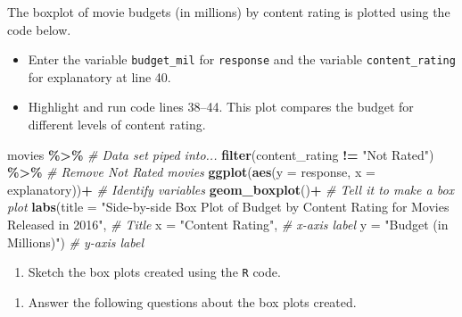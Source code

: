 \documentclass[
]{report}
\newenvironment{Shaded}{\begin{snugshade}}{\end{snugshade}}
\newcommand{\AttributeTok}[1]{\textcolor[rgb]{0.13,0.29,0.53}{#1}}
\newcommand{\CommentTok}[1]{\textcolor[rgb]{0.56,0.35,0.01}{\textit{#1}}}
\newcommand{\FunctionTok}[1]{\textcolor[rgb]{0.13,0.29,0.53}{\textbf{#1}}}
\newcommand{\NormalTok}[1]{#1}
\newcommand{\SpecialCharTok}[1]{\textcolor[rgb]{0.81,0.36,0.00}{\textbf{#1}}}
\newcommand{\StringTok}[1]{\textcolor[rgb]{0.31,0.60,0.02}{#1}}
\providecommand{\tightlist}{%
  \setlength{\itemsep}{0pt}\setlength{\parskip}{0pt}}
\begin{document}
The boxplot of movie budgets (in millions) by content rating is plotted using the code below.

\begin{itemize}
\item
  Enter the variable \texttt{budget\_mil} for \texttt{response} and the variable \texttt{content\_rating} for explanatory at line 40.
\item
  Highlight and run code lines 38--44. This plot compares the budget for different levels of content rating.
\end{itemize}

\begin{Shaded}
\begin{Highlighting}[]
\NormalTok{movies }\SpecialCharTok{\%\textgreater{}\%}  \CommentTok{\# Data set piped into...}
  \FunctionTok{filter}\NormalTok{(content\_rating }\SpecialCharTok{!=} \StringTok{"Not Rated"}\NormalTok{) }\SpecialCharTok{\%\textgreater{}\%} \CommentTok{\# Remove Not Rated movies}
  \FunctionTok{ggplot}\NormalTok{(}\FunctionTok{aes}\NormalTok{(}\AttributeTok{y =}\NormalTok{ response, }\AttributeTok{x =}\NormalTok{ explanatory))}\SpecialCharTok{+}  \CommentTok{\# Identify variables}
  \FunctionTok{geom\_boxplot}\NormalTok{()}\SpecialCharTok{+}  \CommentTok{\# Tell it to make a box plot}
  \FunctionTok{labs}\NormalTok{(}\AttributeTok{title =} \StringTok{"Side{-}by{-}side Box Plot of Budget by Content Rating for Movies Released in 2016"}\NormalTok{,  }
       \CommentTok{\# Title}
       \AttributeTok{x =} \StringTok{"Content Rating"}\NormalTok{,    }\CommentTok{\# x{-}axis label}
       \AttributeTok{y =} \StringTok{"Budget (in Millions)"}\NormalTok{)  }\CommentTok{\# y{-}axis label}
\end{Highlighting}
\end{Shaded}

\begin{enumerate}
\def\labelenumi{\arabic{enumi}.}
\setcounter{enumi}{11}
\tightlist
\item
  Sketch the box plots created using the \texttt{R} code.
\end{enumerate}

\vspace{3in}

\newpage

\begin{enumerate}
\def\labelenumi{\arabic{enumi}.}
\setcounter{enumi}{12}
\tightlist
\item
  Answer the following questions about the box plots created.
\end{enumerate}
\end{document}

